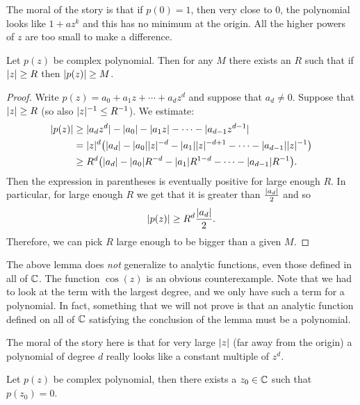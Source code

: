 The moral of the story is that if $p(0) = 1$, then very close to 0, the
polynomial
looks like $1+az^k$ and this has no minimum at the origin.  All the higher
powers of $z$ are too small to make a difference.

\begin{lemma}
Let $p(z)$ be complex polynomial.  Then for any $M$ there exists
an $R$ such that if $\lvert {z} \rvert \geq R$ then $\lvert {p(z)} \rvert \geq M$.
\end{lemma}

\begin{proof}
Write $p(z) = a_0 + a_1 z + \cdots + a_d z^d$ and suppose that
$a_d \not= 0$.
Suppose that $\lvert {z} \rvert \geq R$ (so also $\lvert {z} \rvert^{-1} \leq R^{-1}$).
We estimate:
\begin{equation*}
\begin{split}
\lvert {p(z)} \rvert
& \geq
\lvert {a_d z^d} \rvert -
\lvert {a_0} \rvert - \lvert {a_1 z} \rvert - \cdots - \lvert {a_{d-1} z^{d-1} } \rvert
\\
& =
\lvert {z} \rvert^d \bigl(
\lvert {a_d} \rvert -
\lvert {a_0} \rvert \lvert {z} \rvert^{-d} -
\lvert {a_1} \rvert \lvert {z} \rvert^{-d+1} - \cdots - \lvert {a_{d-1}} \rvert \lvert {z} \rvert^{-1}
\bigr)
\\
& \geq
R^d \bigl(\lvert {a_d} \rvert -
\lvert {a_0} \rvert R^{-d} - \lvert {a_1} \rvert R^{1-d} - \cdots - \lvert {a_{d-1}} \rvert R^{-1} \bigr)
.
\end{split}
\end{equation*}
Then the expression in parentheses is eventually positive for large enough
$R$.  In particular, for large enough $R$ we get that it is greater than
$\frac{\lvert {a_d} \rvert}{2}$ and so
\begin{equation*}
\lvert {p(z)} \rvert
\geq
R^d \frac{\lvert {a_d} \rvert}{2} .
\end{equation*}
Therefore,
we can pick $R$ large enough to be bigger than a given $M$.
\end{proof}

The above lemma does \emph{not} generalize to analytic
functions, even those defined in all of ${\mathbb{C}}$.  The function
$\cos(z)$ is an obvious counterexample.
Note that we had to look
at the term with the largest degree, and we only have such a term for
a polynomial.  In fact, something that we will not prove is that
an analytic function defined on all of ${\mathbb{C}}$ satisfying the conclusion
of the lemma
must be a polynomial.

The moral of the story here is that for very large $\lvert {z} \rvert$ (far away from
the origin) a polynomial of degree $d$ really looks like a constant multiple
of $z^d$.

\begin{thm}
Let $p(z)$ be complex polynomial, then there exists a $z_0 \in {\mathbb{C}}$
such that $p(z_0) = 0$.
\end{thm}

